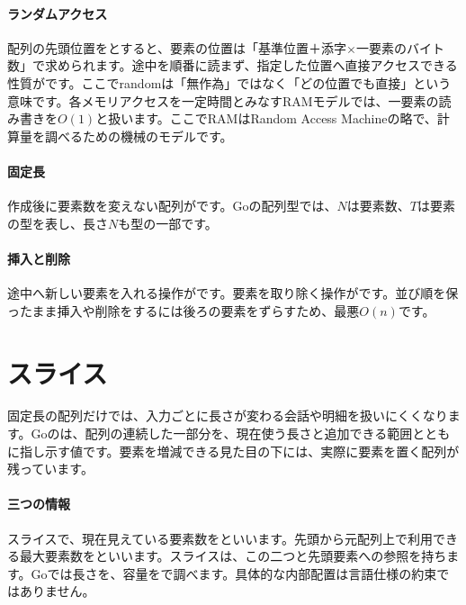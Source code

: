 \begingroup
\begingroup
      \centering
      \vspace{4mm}
\paragraph{ランダムアクセス}
        配列の先頭位置をとすると、要素の位置は「基準位置＋添字$\times$一要素のバイト数」で求められます。途中を順番に読まず、指定した位置へ直接アクセスできる性質がです。ここでrandomは「無作為」ではなく「どの位置でも直接」という意味です。各メモリアクセスを一定時間とみなすRAMモデルでは、一要素の読み書きを$O(1)$と扱います。ここでRAMはRandom Access Machineの略で、計算量を調べるための機械のモデルです。

\par
\endgroup
\medskip
\begingroup
\paragraph{固定長}
        作成後に要素数を変えない配列がです。Goの配列型では、$N$は要素数、$T$は要素の型を表し、長さ$N$も型の一部です。

\paragraph{挿入と削除}
        途中へ新しい要素を入れる操作がです。要素を取り除く操作がです。並び順を保ったまま挿入や削除をするには後ろの要素をずらすため、最悪$O(n)$です。

\par
\endgroup
\par
\endgroup


\section{スライス}
\label{sec:03-runtime-data-14}

固定長の配列だけでは、入力ごとに長さが変わる会話や明細を扱いにくくなります。Goのは、配列の連続した一部分を、現在使う長さと追加できる範囲とともに指し示す値です。要素を増減できる見た目の下には、実際に要素を置く配列が残っています。

\begingroup
\begingroup
      \centering
\par
\endgroup
\medskip
\begingroup
\paragraph{三つの情報}
        スライスで、現在見えている要素数をといいます。先頭から元配列上で利用できる最大要素数をといいます。スライスは、この二つと先頭要素への参照を持ちます。Goでは長さを、容量をで調べます。具体的な内部配置は言語仕様の約束ではありません。


